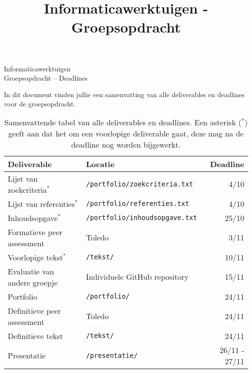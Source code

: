 \documentclass[a4paper]{article}
\title{Informaticawerktuigen - Groepsopdracht}
\begin{document}
\begin{center}
  \huge Informaticawerktuigen \\
  \Huge Groepsopdracht -- Deadlines
\end{center}
\vspace{1em}


In dit document vinden jullie een samenvatting van alle deliverables en deadlines voor de groepsopdracht.

\begin{table}[h]
    \begin{center}
        \begin{tabular}{ l | l r }
            \textbf{Deliverable}            & \textbf{Locatie}                      & \textbf{Deadline} \\ \hline
            Lijst van zoekcriteria$^{\ast}$ & \texttt{/portfolio/zoekcriteria.txt}  & 4/10 \\
            Lijst van referenties$^{\ast}$  & \texttt{/portfolio/referenties.txt}   & 4/10 \\
            Inhoudsopgave$^{\ast}$          & \texttt{/portfolio/inhoudsopgave.txt} & 25/10 \\
            Formatieve peer assessment      & Toledo                                & 3/11 \\
            Voorlopige tekst$^{\ast}$       & \texttt{/tekst/}                      & 10/11 \\
            Evaluatie van andere groepje    & Individuele GitHub repository      & 15/11 \\
            Portfolio                       & \texttt{/portfolio/}                  & 24/11 \\
            Definitieve peer assessment     & Toledo                                & 24/11 \\
            Definitieve tekst               & \texttt{/tekst/}                      & 24/11 \\
            Presentatie                     & \texttt{/presentatie/}                & 26/11 - 27/11 \\
        \end{tabular}
        \caption{
            Samenvattende tabel van alle deliverables en deadlines.
            Een asterisk ($^{\ast}$) geeft aan dat het om een voorlopige deliverable gaat, deze mag na de deadline nog worden bijgewerkt.
        }
    \end{center}
\end{table}


\end{document}
